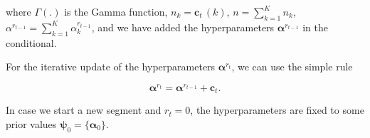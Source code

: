 where $\Gamma(.)$ is the Gamma function, $n_k=\mathbf{c}_t\,(k)$,
$n=\sum_{k=1}^K n_k$,
$\alpha^{r_{t-1}}=\sum_{k=1}^K\alpha^{r_{t-1}}_k$, and we have added the
hyperparameters $\boldsymbol{\alpha}^{r_{t-1}}$ in the conditional.

For the iterative update of the hyperparameters $\boldsymbol{\alpha}^{r_t}$, we
can use the simple rule

\begin{equation}
\label{eqn:alpha_update}
\boldsymbol{\alpha}^{r_t} = \boldsymbol{\alpha}^{r_{t-1}} + \mathbf{c}_{t}.
\end{equation}

In case we start a new segment and $r_t=0$, the hyperparameters are fixed to
some prior values $\boldsymbol{\psi}_0=\{\boldsymbol{\alpha}_0\}$.
